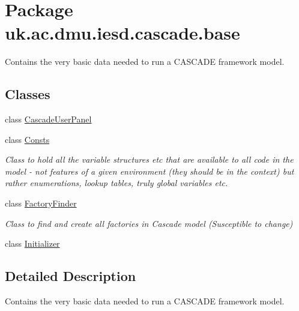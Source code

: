 \hypertarget{namespaceuk_1_1ac_1_1dmu_1_1iesd_1_1cascade_1_1base}{\section{Package uk.\-ac.\-dmu.\-iesd.\-cascade.\-base}
\label{namespaceuk_1_1ac_1_1dmu_1_1iesd_1_1cascade_1_1base}
}


Contains the very basic data needed to run a C\-A\-S\-C\-A\-D\-E framework model.  


\subsection*{Classes}
\begin{DoxyCompactItemize}
\item 
class \hyperlink{classuk_1_1ac_1_1dmu_1_1iesd_1_1cascade_1_1base_1_1_cascade_user_panel}{Cascade\-User\-Panel}
\item 
class \hyperlink{classuk_1_1ac_1_1dmu_1_1iesd_1_1cascade_1_1base_1_1_consts}{Consts}
\begin{DoxyCompactList}\small\item\em Class to hold all the variable structures etc that are available to all code in the model -\/ not features of a given environment (they should be in the context) but rather enumerations, lookup tables, truly global variables etc. \end{DoxyCompactList}\item 
class \hyperlink{classuk_1_1ac_1_1dmu_1_1iesd_1_1cascade_1_1base_1_1_factory_finder}{Factory\-Finder}
\begin{DoxyCompactList}\small\item\em Class to find and create all factories in Cascade model (Susceptible to change) \end{DoxyCompactList}\item 
class \hyperlink{classuk_1_1ac_1_1dmu_1_1iesd_1_1cascade_1_1base_1_1_initializer}{Initializer}
\end{DoxyCompactItemize}


\subsection{Detailed Description}
Contains the very basic data needed to run a C\-A\-S\-C\-A\-D\-E framework model. 